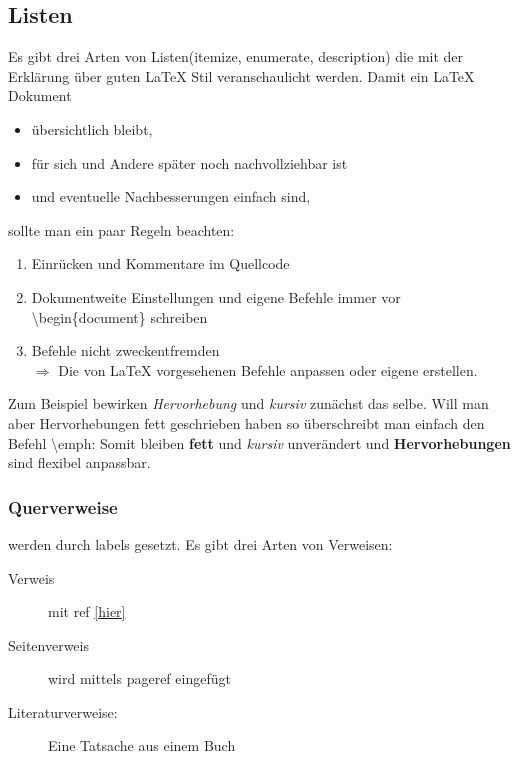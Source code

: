 	\subsection{Listen}
	Es gibt drei Arten von Listen(itemize, enumerate, description) die mit der Erklärung über guten LaTeX Stil veranschaulicht werden.
	Damit ein LaTeX Dokument	%
	\begin{itemize}\itemsep-2pt	
		\item übersichtlich bleibt,
		\item für sich und Andere später noch nachvollziehbar ist
		\item und eventuelle Nachbesserungen einfach sind,
	\end{itemize} 
	sollte man ein paar Regeln beachten:
	\begin{enumerate}			
		\item Einrücken und Kommentare im Quellcode
		\item Dokumentweite Einstellungen und eigene Befehle immer vor \textbackslash begin\{document\} schreiben
		\item Befehle nicht zweckentfremden\\ 
			$\Rightarrow$ Die von LaTeX vorgesehenen Befehle anpassen oder eigene erstellen.			%
	\end{enumerate}
	
	Zum Beispiel bewirken \emph{Hervorhebung} und \textit{kursiv} zunächst das selbe. 
	Will man aber Hervorhebungen fett geschrieben haben so überschreibt man einfach den Befehl \textbackslash emph:
	\renewcommand{\emph}[1]{\textbf{#1}}	%
	Somit bleiben \textbf{fett} und \textit{kursiv} unverändert und \emph{Hervorhebungen} sind flexibel anpassbar.\\
	\subsubsection{Querverweise} werden durch labels gesetzt.\label{hier} Es gibt drei Arten von Verweisen:
	\begin{description}	
		\item[Verweis] mit ref \ref{hier}
		\item[Seitenverweis] wird mittels pageref \pageref{hier} eingefügt
		\item[Literaturverweise:] Eine Tatsache aus einem Buch \cite{bowie}
	\end{description}

